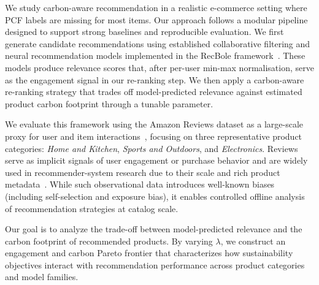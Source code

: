 \documentclass[11pt]{article}
\begin{document}
We study carbon-aware recommendation in a realistic e-commerce setting where PCF labels
are missing for most items. Our approach follows a modular pipeline designed to support
strong baselines and reproducible evaluation. We first generate candidate recommendations
using established collaborative filtering and neural recommendation models implemented in
the RecBole framework~\cite{recbole2021}. These models produce relevance scores that, after
per-user min-max normalisation, serve as the engagement signal in our re-ranking step. We
then apply a carbon-aware re-ranking strategy that trades off model-predicted relevance
against estimated product carbon footprint through a tunable parameter.

We evaluate this framework using the Amazon Reviews dataset as a large-scale proxy for
user and item interactions~\cite{amazon2023}, focusing on three representative product
categories: \textit{Home and Kitchen}, \textit{Sports and Outdoors}, and
\textit{Electronics}. Reviews serve as implicit signals of user engagement or purchase
behavior and are widely used in recommender-system research due to their scale and rich
product metadata~\cite{amazon2015, amazon2023, vicenti2026pcfllm, ecoa2026}. While such
observational data introduces well-known biases (including self-selection and exposure
bias), it enables controlled offline analysis of recommendation strategies at catalog scale.

Our goal is to analyze the trade-off between model-predicted relevance and the carbon
footprint of recommended products. By varying $\lambda$, we construct an engagement and
carbon Pareto frontier that characterizes how sustainability objectives interact with
recommendation performance across product categories and model families.
\end{document}
